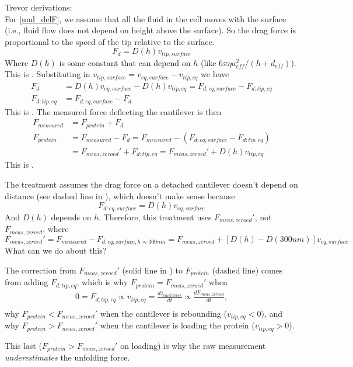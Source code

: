 Trevor derivations: \\
For \cref{mul_delF}, we assume that all the fluid in the cell moves with the surface
 (i.e., fluid flow does not depend on height above the surface).
So the drag force is proportional to the speed of the tip relative to the surface.
\begin{equation}
 F_d = D(h) v_{tip,surface}
\end{equation}
Where $D(h)$ is some constant that can depend on $h$ (like $6 \pi \eta a_{eff}^2 / (h + d_{eff})$).
This is .
Substituting in $v_{tip,surface} = v_{eq,surface} - v_{tip,eq}$ we have
\begin{align}
 F_d &= D(h) v_{eq,surface} - D(h)v_{tip,eq} = F_{d:eq,surface} - F_{d:tip,eq} \\
 F_{d:tip, eq} &= F_{d:eq,surface} - F_d
\end{align}
This is .
The measured force deflecting the cantilever is then
\begin{align}
 F_{measured} &= F_{protein} + F_d \\
 F_{protein} &= F_{measured} - F_d = F_{measured} - (F_{d:eq,surface} - F_{d:tip,eq}) \\
  &= F_{meas,zeroed}' + F_{d:tip,eq} = F_{meas,zeroed}' + D(h)v_{tip,eq}
\end{align}
This is .

The treatment assumes the drag force on a detached cantilever doesn't depend on distance (see dashed line in ), which doesn't make sense because
\begin{equation}
 F_{d:eq,surface} = D(h)v_{eq,surface}
\end{equation}
And $D(h)$ depends on $h$.  Therefore, this treatment uses $F_{meas,zeroed}'$, not $F_{meas,zeroed}$, where
\begin{equation}
  F_{meas,zeroed}' = F_{measured} - F_{d:eq,surface,h\approx300nm}
   = F_{meas,zeroed} + [D(h) - D(300nm)]v_{eq,surface}
\end{equation}
What can we do about this?

The correction from $F_{meas,zeroed}'$ (solid line in ) to $F_{protein}$ (dashed line) comes from adding $F_{d:tip,eq}$, which is why $F_{protein} = F_{meas,zeroed}'$ when
\begin{align}
 0 = F_{d:tip,eq} \propto v_{tip,eq} = \frac{dz_{cantilever}}{dt} \propto \frac{dF_{meas,zeroed}}{dt}, \\ 
\end{align}
why $F_{protein} < F_{meas,zeroed}'$ when the cantilever is rebounding ($v_{tip,eq} < 0$), and
why $F_{protein} > F_{meas,zeroed}'$ when the cantilever is loading the protein ($v_{tip,eq} > 0$).

This last ($F_{protein} > F_{meas,zeroed}'$ on loading) is why the raw
measurement \emph{underestimates} the unfolding force.
